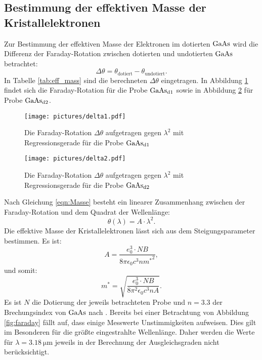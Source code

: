 \subsection{Bestimmung der effektiven Masse der Kristallelektronen}
Zur Bestimmung der effektiven Masse der Elektronen im dotierten $\ce{GaAs}$ wird die Differenz der Faraday-Rotation zwischen dotierten und undotierten $\ce{GaAs}$ betrachtet:
\begin{equation}
\Delta \theta=\theta_{\mathrm{dotiert}}-\theta_{\mathrm{undotiert}}\mathrm{.}
\end{equation}
In Tabelle \ref{tab:eff_mass} sind die berechneten $\Delta\theta$ eingetragen. In Abbildung \ref{fig:delta1} findet sich die Faraday-Rotation für die Probe $\ce{GaAs}_{\mathrm{d1}}$ sowie in Abbildung \ref{fig:delta2}
für Probe $\ce{GaAs}_{\mathrm{d2}}$.

\begin{figure}
  \centering
  \texttt{[image: pictures/delta1.pdf]}
  \caption{Die Faraday-Rotation $\Delta \theta$ aufgetragen gegen $\lambda^{2}$ mit Regressionsgerade für die Probe $\ce{GaAs}_{\mathrm{d1}}$}
  \label{fig:delta1}
\end{figure}
\begin{figure}
  \centering
  \texttt{[image: pictures/delta2.pdf]}
  \caption{Die Faraday-Rotation $\Delta \theta$ aufgetragen gegen $\lambda^{2}$ mit Regressionsgerade für die Probe $\ce{GaAs}_{\mathrm{d2}}$}
  \label{fig:delta2}
\end{figure}
Nach Gleichung \eqref{eqn:Masse} besteht ein linearer Zusammenhang zwischen der Faraday-Rotation und dem Quadrat der Wellenlänge:
\begin{equation}
    \theta(\lambda)=A\cdot\lambda^2 \mathrm{.}
\end{equation}
Die effektive Masse der Kristallelektronen lässt sich aus dem Steigungsparameter bestimmen.
Es ist:
\begin{equation}
  A=\frac{e_{\mathrm{0}}^3 \cdot NB}{8\pi \epsilon_{\mathrm{0}} c^3 n {m^{*}}^2}\mathrm{,}
\end{equation}
und somit:
\begin{equation}
  {m^{*}}=\sqrt{\frac{e_{\mathrm{0}}^3 \cdot NB}{8\pi^2 \epsilon_{\mathrm{0}} c^3 n A}}\mathrm{.}
\end{equation}
Es ist $N$ die Dotierung der jeweils betrachteten Probe und $n=3.3$ der Brechungsindex von $\ce{GaAs}$ nach \cite{ioffe}.
Bereits bei einer Betrachtung von Abbildung \ref{fig:faraday} fällt auf, dass einige Messwerte Unstimmigkeiten aufweisen. Dies gilt im Besonderen für die größte eingestrahlte Wellenlänge. Daher werden die Werte für $\lambda=\SI{3.18}{\micro\meter}$ jeweils in der Berechnung der Ausgleichsgraden nicht berücksichtigt.
